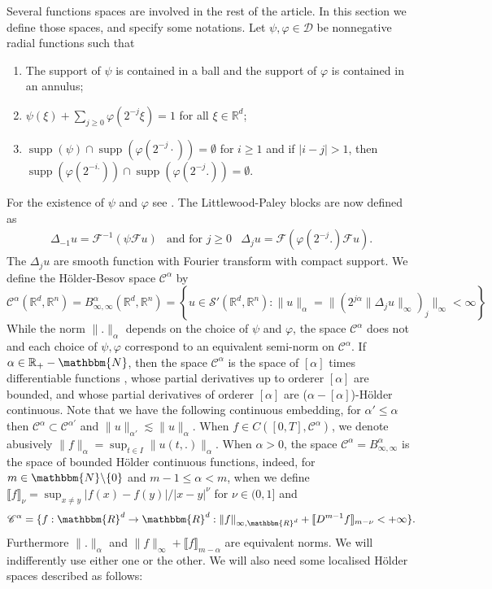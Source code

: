 \documentclass[a4paper,11pt]{article}
\newcommand{\tmop}[1]{\ensuremath{\operatorname{#1}}}
\newcommand{\CC}{\mathscr C}
\newcommand{\CF}{\mathscr F}
\newcommand{\RR}{\mathbb R}
\begin{document}
Several functions spaces are involved in the rest of the article. In this
section we define those spaces, and specify some notations.
Let $\psi , \varphi \in \mathcal{D}$ be nonnegative radial functions such
that
\begin{enumerate}
  \item The support of $\psi$ is contained in a ball and the support of
  $\varphi$ is contained in an annulus;
  
  \item $\psi ( \xi ) + \sum_{j \ge 0} \varphi (2^{-j} \xi ) =1$ for all $\xi
  \in \RR^{d}$;
  
  \item $\tmop{supp} ( \psi ) \cap \tmop{supp} ( \varphi (2^{-j} \cdot )) =
  \emptyset$ for $i \ge 1$ and if $|i-j| >1$, then $\tmop{supp} ( \varphi
  (2^{-i.} )) \cap \tmop{supp} ( \varphi (2^{-j} .)) = \emptyset$.
\end{enumerate}
For the existence of $\psi$ and $\varphi$ see {\cite{bahouri_fourier_2011}}.
The Littlewood-Paley blocks are now defined as
\[ \begin{array}{crlc}
     \Delta_{-1} u= \CF^{-1} ( \psi \CF u) & \text{and for $j\ge 0$}
 & \Delta_{j} u= \CF ( \varphi (2^{-j} .) \CF u) .
   \end{array} \]
The $\Delta_{j} u$ are smooth function with Fourier transform with compact
support. We define the H\"older-Besov space $\CC^{\alpha}$ by
\[ \CC^{\alpha} ( \RR^{d} , \RR^{n} ) =B^{\alpha}_{\infty , \infty} ( \RR^{d}
   , \RR^{n} ) = \left\{ u \in \mathcal{S}' ( \RR^{d} , \RR^{n}
   ):\|u\|_{\alpha} =\| ( 2^{j \alpha} \| \Delta_{j} u\|_{\infty} )_{j}
   \|_{\infty} < \infty \right\} \]
While the norm $\|.\|_{\alpha}$ depends on the choice of $\psi$ and $\varphi$,
the space $\CC^{\alpha}$ does not and each choice of $\psi , \varphi$
correspond to an equivalent semi-norm on $\CC^{\alpha}$. If $\alpha \in
\RR_{+} -\mathbbm{N}$, then the space $\CC^{\alpha}$ is the space of $[ \alpha
]$ times differentiable functions , whose partial derivatives up to orderer $[
\alpha ]$ are bounded, and whose partial derivatives of orderer $[ \alpha ]$
are ($\alpha - [ \alpha ]$)-H\"older continuous. Note that we have the
following continuous embedding, for $\alpha' \leqslant \alpha$ then
$\CC^{\alpha} \subset \CC^{\alpha'}$ and $\|u\|_{\alpha'} \lesssim
\|u\|_{\alpha}$. When $f \in C \left( [ 0,T ] , \CC^{\alpha} \right)^{}$, we
denote abusively $\| f \|_{\alpha} = \sup_{t \in I} \|u(t,.)\|_{\alpha}$. When
$\alpha >0$, the space $\CC^{\alpha} =B^{\alpha}_{\infty , \infty}$ is the
space of bounded H\"older continuous functions, indeed, for $m \in
\mathbbm{N}\backslash \{ 0 \}$ and $m-1 \leqslant \alpha <m$, when we define
$\llbracket f \rrbracket_{\nu} = \sup_{x \neq y} | f ( x ) -f ( y ) | / | x-y
|^{\nu}$ for $\nu \in ( 0,1 ]$ and
\[ \CC^{\alpha} = \{ f:\mathbbm{R}^{d} \rightarrow \mathbbm{R}^{d} : \| f
   \|_{\infty ,\mathbbm{R}^{d}} + \llbracket D^{m-1} f \rrbracket_{m- \nu} <+
   \infty \} . \]
Furthermore $\| . \|_{\alpha}$ and $\| f \|_{\infty} + \llbracket f
\rrbracket_{m- \alpha}$ are equivalent norms. We will indifferently use either
one or the other. We will also need some localised H\"older spaces described as
follows:
\end{document}
